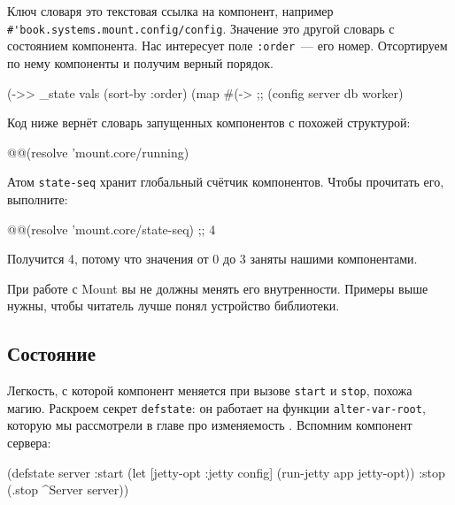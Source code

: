 Ключ словаря это текстовая ссылка на компонент, например
\verb|#'book.systems.mount.config/config|. Значение это другой словарь с
состоянием компонента. Нас интересует поле \verb|:order|~--- его
номер. Отсортируем по нему компоненты и получим верный порядок.

\begin{english}
  \begin{clojure}
(->> _state
     vals
     (sort-by :order)
     (map #(-> %
;; (config server db worker)
  \end{clojure}
\end{english}

Код ниже вернёт словарь запущенных компонентов с похожей структурой:

\begin{english}
  \begin{clojure}
@@(resolve 'mount.core/running)
  \end{clojure}
\end{english}

Атом \verb|state-seq| хранит глобальный счётчик компонентов. Чтобы прочитать
его, выполните:

\begin{english}
  \begin{clojure}
@@(resolve 'mount.core/state-seq) ;; 4
  \end{clojure}
\end{english}

\noindent
Получится 4, потому что значения от 0 до 3 заняты нашими компонентами.

При работе с Mount вы не должны менять его внутренности. Примеры выше нужны,
чтобы читатель лучше понял устройство библиотеки.

\subsection{Состояние}


Легкость, с которой компонент меняется при вызове \verb|start| и
\verb|stop|, похожа магию. Раскроем секрет \verb|defstate|: он работает на
функции \verb|alter-var-root|, которую мы рассмотрели в главе про
изменяемость . Вспомним компонент сервера:

\begin{english}
  \begin{clojure}
(defstate server
  :start (let [{jetty-opt :jetty} config]
           (run-jetty app jetty-opt))
  :stop (.stop ^Server server))
  \end{clojure}
\end{english}

